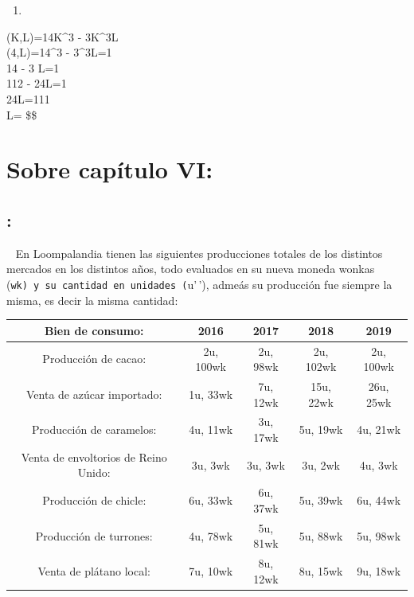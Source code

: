 \documentclass[
  letterpaper,
  DIV=11,
  numbers=noendperiod]{scrreport}
\providecommand{\tightlist}{%
  \setlength{\itemsep}{0pt}\setlength{\parskip}{0pt}}\usepackage{longtable,booktabs,array}
\begin{document}
\begin{enumerate}
\def\labelenumi{\arabic{enumi})}
\setcounter{enumi}{1}
\tightlist
\item
\end{enumerate}

(K,L)=14K\^{}3 - 3K\^{}3L \[
\] (4,L)=14\^{}3 - 3\^{}3L=1 \[
\] 14 - 3 L=1 \[
\] 112 - 24L=1 \[
\] 24L=111 \[
\] L= \$\$

\hypertarget{sobre-capuxedtulo-vi-1}{%
\section{Sobre capítulo VI:}\label{sobre-capuxedtulo-vi-1}}

\hypertarget{section-41}{%
\subsection{:}\label{section-41}}

~ En Loompalandia tienen las siguientes producciones totales de los
distintos mercados en los distintos años, todo evaluados en su nueva
moneda wonkas
(\texttt{wk\textquotesingle{}\textquotesingle{})\ y\ su\ cantidad\ en\ unidades\ (}u'\,'),
admeás su producción fue siempre la misma, es decir la misma cantidad:

\begin{table}[h]
    \centering
    \begin{tabular}{|c|c|c|c|c|}
        \hline
        Bien de consumo: & 2016 & 2017 & 2018 & 2019 \\\hline
        Producción de cacao: & 2u, 100wk & 2u, 98wk & 2u, 102wk & 2u, 100wk \\\hline
        Venta de azúcar importado: & 1u, 33wk & 7u, 12wk & 15u, 22wk & 26u, 25wk\\\hline
        Producción de caramelos: & 4u, 11wk & 3u, 17wk & 5u, 19wk & 4u, 21wk\\\hline
        Venta de envoltorios de Reino Unido: & 3u, 3wk & 3u, 3wk & 3u, 2wk & 4u, 3wk\\\hline
        Producción de chicle: & 6u, 33wk & 6u, 37wk & 5u, 39wk & 6u, 44wk\\\hline
        Producción de turrones: & 4u, 78wk & 5u, 81wk & 5u, 88wk & 5u, 98wk\\\hline
        Venta de plátano local: & 7u, 10wk & 8u, 12wk & 8u, 15wk & 9u, 18wk\\\hline
    \end{tabular}
\end{table}
\end{document}
